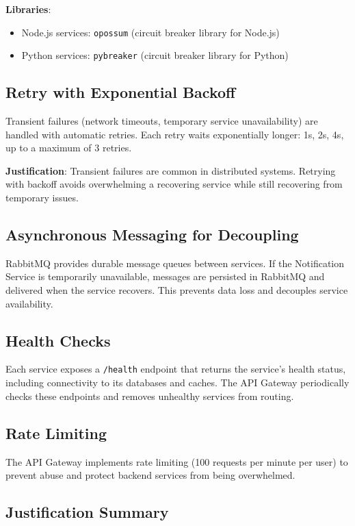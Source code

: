 \documentclass[12pt,a4paper]{article}
\begin{document}
\textbf{Libraries}:
\begin{itemize}
    \item Node.js services: \texttt{opossum} (circuit breaker library for Node.js)
    \item Python services: \texttt{pybreaker} (circuit breaker library for Python)
\end{itemize}

\subsection{Retry with Exponential Backoff}

Transient failures (network timeouts, temporary service unavailability) are handled with automatic retries. Each retry waits exponentially longer: 1s, 2s, 4s, up to a maximum of 3 retries.

\textbf{Justification}: Transient failures are common in distributed systems. Retrying with backoff avoids overwhelming a recovering service while still recovering from temporary issues.

\subsection{Asynchronous Messaging for Decoupling}

RabbitMQ provides durable message queues between services. If the Notification Service is temporarily unavailable, messages are persisted in RabbitMQ and delivered when the service recovers. This prevents data loss and decouples service availability.

\subsection{Health Checks}

Each service exposes a \texttt{/health} endpoint that returns the service's health status, including connectivity to its databases and caches. The API Gateway periodically checks these endpoints and removes unhealthy services from routing.

\subsection{Rate Limiting}

The API Gateway implements rate limiting (100 requests per minute per user) to prevent abuse and protect backend services from being overwhelmed.

\subsection{Justification Summary}
\end{document}
